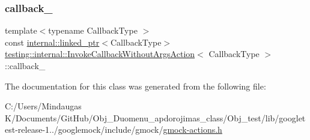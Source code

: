 \subsubsection{\texorpdfstring{callback\_}{callback\_}}
{\footnotesize\ttfamily template$<$typename Callback\+Type $>$ \\
const \mbox{\hyperlink{classtesting_1_1internal_1_1linked__ptr}{internal\+::linked\+\_\+ptr}}$<$Callback\+Type$>$ \mbox{\hyperlink{classtesting_1_1internal_1_1_invoke_callback_without_args_action}{testing\+::internal\+::\+Invoke\+Callback\+Without\+Args\+Action}}$<$ Callback\+Type $>$\+::callback\+\_\+\hspace{0.3cm}{\ttfamily [private]}}



The documentation for this class was generated from the following file\+:\begin{DoxyCompactItemize}
\item 
C\+:/\+Users/\+Mindaugas K/\+Documents/\+Git\+Hub/\+Obj\+\_\+\+Duomenu\+\_\+apdorojimas\+\_\+class/\+Obj\+\_\+test/lib/googletest-\/release-\/1../googlemock/include/gmock/\mbox{\hyperlink{_obj__test_2lib_2googletest-release-1_88_81_2googlemock_2include_2gmock_2gmock-actions_8h}{gmock-\/actions.\+h}}\end{DoxyCompactItemize}
